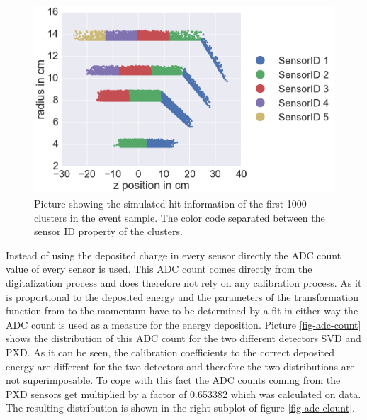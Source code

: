 \begin{figure}
 \centering
 \includegraphics[width=0.8\linewidth]{figures/vxd/cluster_positions.png}
 \caption{Picture showing the simulated hit information of the first 1000 clusters in the event sample. The color code separated between the sensor ID property of the clusters.}
 \label{fig-cluster-position}
\end{figure}

Instead of using the deposited charge in every sensor directly the ADC count value of every sensor is used. This ADC count comes directly from the digitalization process and does therefore not rely on any calibration process. As it is proportional to the deposited energy and the parameters of the transformation function from \dedx to the momentum have to be determined by a fit in either way the ADC count is used as a measure for the energy deposition. Picture \ref{fig-adc-count} shows the distribution of this ADC count for the two different detectors SVD and PXD. As it can be seen, the calibration coefficients to the correct deposited energy are different for the two detectors and therefore the two distributions are not superimposable. To cope with this fact the ADC counts coming from the PXD sensors get multiplied by a factor of 0.653382 which was calculated on data. The resulting distribution is shown in the right subplot of figure \ref{fig-adc-clount}.

